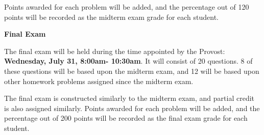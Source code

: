 Points awarded for each problem will be added, and the percentage out of 120 points will be recorded as the midterm exam grade for each student.

\textbf{\large Final Exam}

The final exam will be held during the time appointed by the Provost: \textbf{Wednesday, July 31, 8:00am- 10:30am}. It will consist of 20 questions. 8 of these questions will be based upon the midterm exam, and 12 will be based upon other homework problems assigned since the midterm exam.

The final exam is constructed similarly to the midterm exam, and partial credit is also assigned similarly. Points awarded for each problem will be added, and the percentage out of 200 points will be recorded as the final exam grade for each student.


